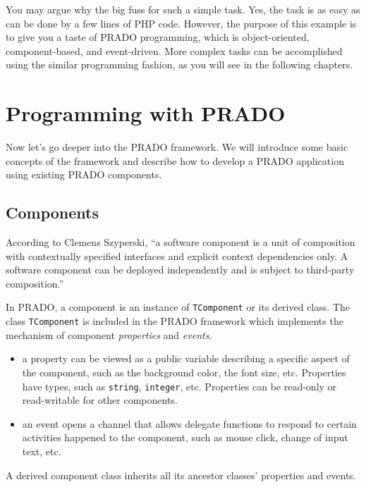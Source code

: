 \documentclass{book}
\begin{document}
You may argue why the big fuss for such a simple task. Yes, the
task is as easy as can be done by a few lines of PHP code.
However, the purpose of this example is to give you a taste of
PRADO programming, which is object-oriented, component-based, and
event-driven. More complex tasks can be accomplished using the
similar programming fashion, as you will see in the following
chapters.


\chapter{Programming with PRADO}

Now let's go deeper into the PRADO framework. We will introduce
some basic concepts of the framework and describe how to develop a
PRADO application using existing PRADO components.


\section{Components}

According to Clemens Szyperski, ``a software component is a unit
of composition with contextually specified interfaces and explicit
context dependencies only. A software component can be deployed
independently and is subject to third-party composition.''


In PRADO, a component is an instance of \verb|TComponent| or its
derived class. The class \verb|TComponent| is included in the
PRADO framework which implements the mechanism of component
\emph{properties} and \emph{events}.
\begin{itemize}

\item a property can be viewed as a public variable describing a
specific aspect of the component, such as the background color,
the font size, etc. Properties have types, such as \verb|string|,
\verb|integer|, etc. Properties can be read-only or read-writable
for other components.

\item an event opens a channel that allows delegate functions to
respond to certain activities happened to the component, such as
mouse click, change of input text, etc.

\end{itemize}
A derived component class inherits all its ancestor classes'
properties and events.
\end{document}
